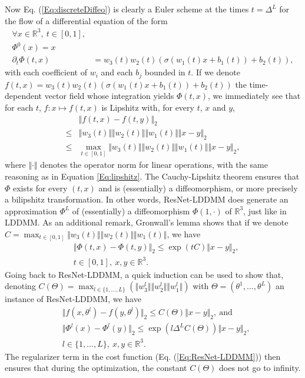 \documentclass[10pt,journal,compsoc]{IEEEtran}
\newcommand{\real}{\ensuremath{\mathbb{R}}}
\begin{document}
Now Eq. (\ref{Eq:discreteDiffeo}) is clearly a Euler scheme at the times $t=\Delta^L$ for the flow of a differential equation of the form
\begin{equation} \label{Eq:contDiffeo}\begin{split}
\forall x\in\real^3,\ t\in [0,1],\\ 
\Phi^0(x)=x\\
\partial_t\Phi(t,x)&=w_3(t)w_2(t)(\sigma(w_1(t)x+b_1(t))+b_2(t)),
 \end{split}
\end{equation}
with each coefficient of $w_i$ and each $b_j$ bounded in $t$. If we denote $f(t,x)=w_3(t)w_2(t)(\sigma(w_1(t)x+b_1(t))+b_2(t))$ the time-dependent vector field whose integration yields $\Phi(t,x)$, we immediately see that for each $t$, $f:x\mapsto f(t,x)$ is Lipshitz with, for every $t$, $x$ and $y$,
\begin{equation}\label{eq:LipshitzVF}\begin{split}
&\Vert f(t,x)-f(t,y)\Vert_2 \\
\leq &\Vert w_3(t)\Vert \Vert w_2(t)\Vert\Vert w_1(t)\Vert\Vert x-y\Vert_2\\\leq& \max_{t\in [0,1]} \Vert w_3(t)\Vert \Vert w_2(t)\Vert\Vert w_1(t)\Vert\Vert x-y\Vert_2,
\end{split}
\end{equation}
where $\Vert \cdot\Vert$ denotes the operator norm for linear operations, with the same reasoning as in Equation \eqref{Eq:lipshitz}. The Cauchy-Lipshitz theorem ensures that $\Phi$ exists for every $(t,x)$ and is (essentially) a diffeomorphism, or more precisely a bilipshitz transformation. In other words, ResNet-LDDMM does generate an approximation $\Phi^L$ of (essentially) a diffeomorphism $\Phi(1,\cdot)$ of $\real^3$, just like in LDDMM. As an additional remark, Gronwall's lemma shows that if we denote $C=\max_{t\in [0,1]} \Vert w_3(t)\Vert \Vert w_2(t)\Vert\Vert w_1(t)\Vert$, we have
\begin{equation}\begin{split}
    &\Vert\Phi(t,x)-\Phi(t,y)\Vert_2\leq \exp(tC)\Vert x-y\Vert_2,
    \\
   & t\in[0,1],\ x,y\in\real^3.
    \end{split}
\end{equation}
Going back to ResNet-LDDMM, a quick induction can be used to show that, denoting $C(\Theta)=\max_{l\in\{1,\dots,L\}}(\Vert w_3^l\Vert \Vert w_2^l\Vert\Vert w_1^l\Vert) $ with $\Theta=(\theta^1,\dots,\theta^L)$ an instance of ResNet-LDDMM, we have
\begin{equation}\begin{split}
    &\Vert f(x,\theta^l)-f(y,\theta^l)\Vert_2\leq C(\Theta)\Vert x-y\Vert_2,\ \text{and}\\
    &\Vert\Phi^l(x)-\Phi^l(y)\Vert_2\leq \exp(l\Delta^LC(\Theta))\Vert x-y\Vert_2,\\ 
    &l\in\{1,\dots,L\},\ x,y\in\real^3.
    \end{split}
\end{equation}
The regularizer term in the cost function (Eq. (\ref{Eq:ResNet-LDDMM})) then ensures that during the optimization, the constant $C(\Theta)$ does not go to infinity.
\end{document}
